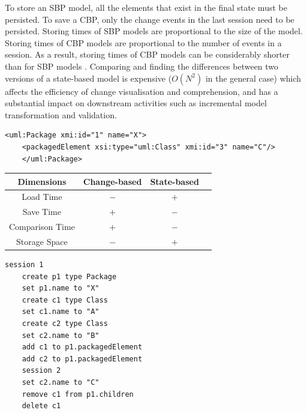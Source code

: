 To store an SBP model, all the elements that exist in the final state must be persisted. To save a CBP, only the change events in the last session need to be persisted. Storing times of SBP models are proportional to the size of the model. Storing times of CBP models are proportional to the number of events in a session. As a result, storing times of CBP models can be considerably shorter than for SBP models \cite{yohannis2018towards}. Comparing and finding the differences between two versions of a state-based model is expensive \cite{Kolovos:2009:DMM:1564596.1564641} ($O(N^2)$ in the general case) which affects the efficiency of change visualisation and comprehension, and has a substantial impact on downstream activities such as incremental model transformation \cite{DBLP:conf/ecmdafa/OgunyomiRK15} and validation.

\vspace{-15pt}
\begin{minipage}[t]{0.59\linewidth}
    \begin{lstlisting}[style=xmi,caption={The UML2 model of the example model in Fig. \ref{fig:illustration_cbp}.},label=lst:xmimodel2]
    <uml:Package xmi:id="1" name="X">
    <packagedElement xsi:type="uml:Class" xmi:id="3" name="C"/>
    </uml:Package>
    \end{lstlisting}
    
    \centering
    \label{table:persistence_comparsion}
    \begin{small}
        \begin{tabular}{ c c c c }
            \hline 
            \textbf{Dimensions} & \textbf{Change-based} & \textbf{State-based} \\
            \hline 
            Load Time & $-$ & $+$ \\
            Save Time & $+$ & $-$ \\
            Comparison Time & $+$ & $-$ \\
            Storage Space & $-$ & $+$ \\
            \hline 
        \end{tabular}
    \end{small}
\end{minipage}
\hfill
\begin{minipage}[t]{0.39\linewidth}
    \begin{lstlisting}[style=eol,caption={The textual CBP for producing state-based model in List. \ref{lst:xmimodel2}. Its visual illustration is in Fig. \ref{fig:illustration_cbp}.},label=lst:cbpmodel]
    session 1
    create p1 type Package
    set p1.name to "X" 
    create c1 type Class
    set c1.name to "A"
    create c2 type Class
    set c2.name to "B"
    add c1 to p1.packagedElement 
    add c2 to p1.packagedElement
    session 2
    set c2.name to "C"
    remove c1 from p1.children 
    delete c1
    \end{lstlisting}
\end{minipage}

